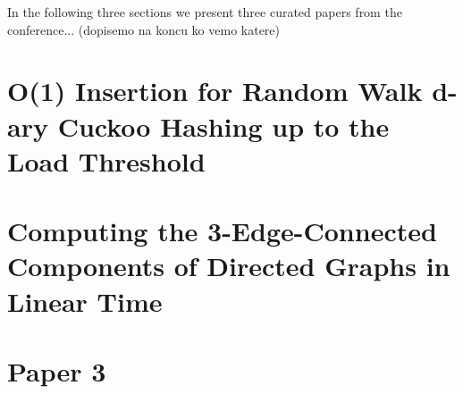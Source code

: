 \documentclass[
	a4paper, %
	10pt, %
	unnumberedsections, %
	twoside, %
]{LTJournalArticle}
\theoremstyle{remark}
\begin{document}
In the following three sections we present three curated papers from the conference... (dopisemo na koncu ko vemo katere)


\section{O(1) Insertion for Random Walk d-ary Cuckoo Hashing
up to the Load Threshold}



\section{Computing the 3-Edge-Connected Components of Directed Graphs in Linear Time}




\section{Paper 3}




\printbibliography %

\end{document}
